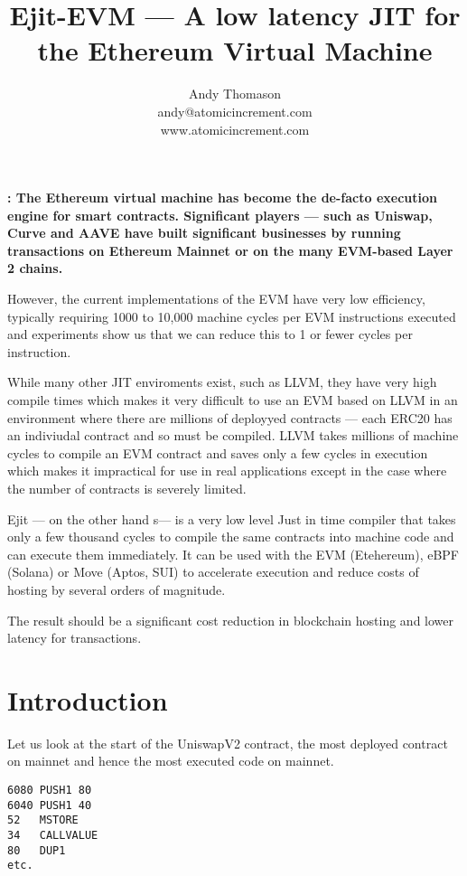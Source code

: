 \documentclass{article}
\title{Ejit-EVM --- A low latency JIT for the Ethereum Virtual Machine}
\author{Andy Thomason \\ andy@atomicincrement.com \\ www.atomicincrement.com}
\date{} %
\renewenvironment{abstract}{\noindent\bfseries\abstractname:\normalfont}{}
\begin{document}
\maketitle
\begin{abstract}
    The Ethereum virtual machine has become the de-facto execution engine for smart contracts.
    Significant players --- such as Uniswap, Curve and AAVE have built significant businesses
    by running transactions on Ethereum Mainnet or on the many EVM-based Layer 2 chains.

    However, the current implementations of the EVM have very low efficiency, typically requiring
    1000 to 10,000 machine cycles per EVM instructions executed and experiments show us that we
    can reduce this to 1 or fewer cycles per instruction.

    While many other JIT enviroments exist, such as LLVM, they have very high compile times which
    makes it very difficult to use an EVM based on LLVM in an environment where there are millions
    of deployyed contracts --- each ERC20 has an indiviudal contract and so must be compiled.
    LLVM takes millions of machine cycles to compile an EVM contract and saves only a few
    cycles in execution which makes it impractical for use in real applications except in the
    case where the number of contracts is severely limited.

    Ejit --- on the other hand s--- is a very low level Just in time compiler that takes only a few
    thousand cycles to compile the same contracts into machine code and can execute them
    immediately. It can be used with the EVM (Etehereum), eBPF (Solana) or Move (Aptos, SUI)
    to accelerate execution and reduce costs of hosting by several orders of magnitude.

    The result should be a significant cost reduction in blockchain hosting and lower latency
    for transactions.
\end{abstract}

\section{Introduction}\label{sec:introduction}

Let us look at the start of the UniswapV2 contract, the most deployed contract
on mainnet and hence the most executed code on mainnet.

\begin{verbatim}
6080 PUSH1 80
6040 PUSH1 40
52   MSTORE
34   CALLVALUE
80   DUP1
etc.
\end{verbatim}
\end{document}

